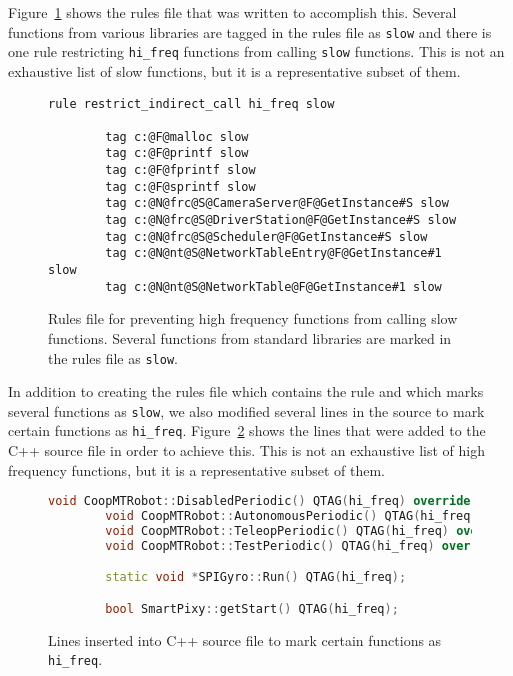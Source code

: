Figure~\ref{lst:app:blocking:rules} shows the rules file that was written to accomplish this.  Several functions from various libraries are tagged in the rules file as \lstinline{slow} and there is one rule restricting \lstinline{hi_freq} functions from calling \lstinline{slow} functions.  This is not an exhaustive list of slow functions, but it is a representative subset of them.  

\begin{figure}
    \begin{lstlisting}[gobble=8]
        rule restrict_indirect_call hi_freq slow

        tag c:@F@malloc slow
        tag c:@F@printf slow
        tag c:@F@fprintf slow
        tag c:@F@sprintf slow
        tag c:@N@frc@S@CameraServer@F@GetInstance#S slow
        tag c:@N@frc@S@DriverStation@F@GetInstance#S slow
        tag c:@N@frc@S@Scheduler@F@GetInstance#S slow
        tag c:@N@nt@S@NetworkTableEntry@F@GetInstance#1 slow
        tag c:@N@nt@S@NetworkTable@F@GetInstance#1 slow
    \end{lstlisting}
    \caption{Rules file for preventing high frequency functions from calling slow functions.  Several functions from standard libraries are marked in the rules file as \lstinline{slow}.}
    \label{lst:app:blocking:rules}
\end{figure}

In addition to creating the rules file which contains the rule and which marks several functions as \lstinline{slow}, we also modified several lines in the source to mark certain functions as \lstinline{hi_freq}.  Figure~\ref{lst:app:blocking:code} shows the lines that were added to the C++ source file in order to achieve this.  This is not an exhaustive list of high frequency functions, but it is a representative subset of them.  

\begin{figure}
    \begin{lstlisting}[language=c++,gobble=8]
        void CoopMTRobot::DisabledPeriodic() QTAG(hi_freq) override;
        void CoopMTRobot::AutonomousPeriodic() QTAG(hi_freq) override;
        void CoopMTRobot::TeleopPeriodic() QTAG(hi_freq) override;
        void CoopMTRobot::TestPeriodic() QTAG(hi_freq) override;

        static void *SPIGyro::Run() QTAG(hi_freq);

        bool SmartPixy::getStart() QTAG(hi_freq);
    \end{lstlisting}
    \caption{Lines inserted into C++ source file to mark certain functions as \lstinline{hi_freq}.}
    \label{lst:app:blocking:code}
\end{figure}

